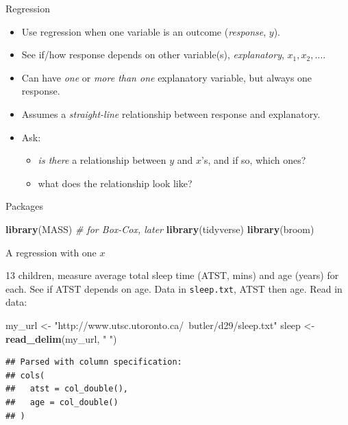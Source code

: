 \documentclass[ignorenonframetext,]{beamer}
\newenvironment{Shaded}{\begin{snugshade}}{\end{snugshade}}
\newcommand{\CommentTok}[1]{\textcolor[rgb]{0.56,0.35,0.01}{\textit{#1}}}
\newcommand{\KeywordTok}[1]{\textcolor[rgb]{0.13,0.29,0.53}{\textbf{#1}}}
\newcommand{\NormalTok}[1]{#1}
\newcommand{\StringTok}[1]{\textcolor[rgb]{0.31,0.60,0.02}{#1}}
\providecommand{\tightlist}{%
  \setlength{\itemsep}{0pt}\setlength{\parskip}{0pt}}
\begin{document}
\begin{frame}{Regression}
\protect\hypertarget{regression}{}

\begin{itemize}
\item
  Use regression when one variable is an outcome (\emph{response},
  \(y\)).
\item
  See if/how response depends on other variable(s), \emph{explanatory},
  \(x_1, x_2,\ldots\).
\item
  Can have \emph{one} or \emph{more than one} explanatory variable, but
  always one response.
\item
  Assumes a \emph{straight-line} relationship between response and
  explanatory.
\item
  Ask:

  \begin{itemize}
  \tightlist
  \item
    \emph{is there} a relationship between \(y\) and \(x\)'s, and if so,
    which ones?
  \item
    what does the relationship look like?
  \end{itemize}
\end{itemize}

\end{frame}

\begin{frame}[fragile]{Packages}
\protect\hypertarget{packages}{}

\begin{Shaded}
\begin{Highlighting}[]
\KeywordTok{library}\NormalTok{(MASS) }\CommentTok{# for Box-Cox, later}
\KeywordTok{library}\NormalTok{(tidyverse)}
\KeywordTok{library}\NormalTok{(broom)}
\end{Highlighting}
\end{Shaded}

\end{frame}

\begin{frame}[fragile]{A regression with one \(x\)}
\protect\hypertarget{a-regression-with-one-x}{}

13 children, measure average total sleep time (ATST, mins) and age
(years) for each. See if ATST depends on age. Data in
\texttt{sleep.txt}, ATST then age. Read in data:

\begin{Shaded}
\begin{Highlighting}[]
\NormalTok{my_url <-}\StringTok{ "http://www.utsc.utoronto.ca/~butler/d29/sleep.txt"}
\NormalTok{sleep <-}\StringTok{ }\KeywordTok{read_delim}\NormalTok{(my_url, }\StringTok{" "}\NormalTok{)}
\end{Highlighting}
\end{Shaded}

\begin{verbatim}
## Parsed with column specification:
## cols(
##   atst = col_double(),
##   age = col_double()
## )
\end{verbatim}

\end{frame}
\end{document}

